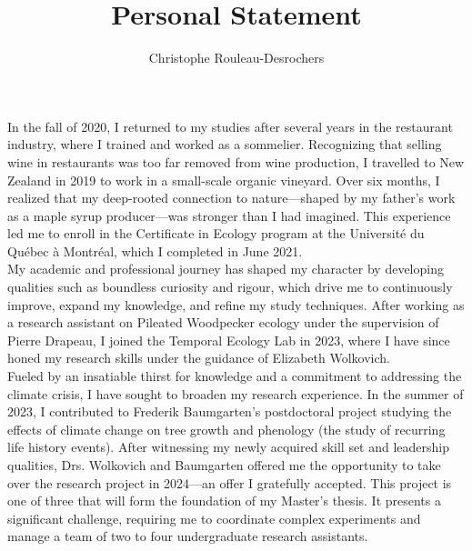 \documentclass[11pt,letter]{article}
\title{Personal Statement}
\author{Christophe Rouleau-Desrochers}
\begin{document}

\maketitle

In the fall of 2020, I returned to my studies after several years in the restaurant industry, where I trained and worked as a sommelier. Recognizing that selling wine in restaurants was too far removed from wine production, I travelled to New Zealand in 2019 to work in a small-scale organic vineyard. Over six months, I realized that my deep-rooted connection to nature—shaped by my father’s work as a maple syrup producer—was stronger than I had imagined. This experience led me to enroll in the Certificate in Ecology program at the Université du Québec à Montréal, which I completed in June 2021. \\

My academic and professional journey has shaped my character by developing qualities such as boundless curiosity and rigour, which drive me to continuously improve, expand my knowledge, and refine my study techniques. After working as a research assistant on Pileated Woodpecker ecology under the supervision of Pierre Drapeau, I joined the Temporal Ecology Lab in 2023, where I have since honed my research skills under the guidance of Elizabeth Wolkovich. \\

Fueled by an insatiable thirst for knowledge and a commitment to addressing the climate crisis, I have sought to broaden my research experience. In the summer of 2023, I contributed to Frederik Baumgarten’s postdoctoral project studying the effects of climate change on tree growth and phenology (the study of recurring life history events). After witnessing my newly acquired skill set and leadership qualities, Drs. Wolkovich and Baumgarten offered me the opportunity to take over the research project in 2024—an offer I gratefully accepted. This project is one of three that will form the foundation of my Master’s thesis. It presents a significant challenge, requiring me to coordinate complex experiments and manage a team of two to four undergraduate research assistants. \\
\end{document}
